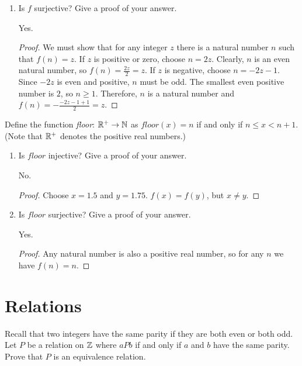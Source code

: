 \documentclass[]{exam}
\begin{document}
\begin{questions}
\begin{enumerate}[label=\alph*)]
\begin{solution}
\end{solution}
\item Is $f$ surjective? Give a proof of your answer.
\begin{solution}
Yes.
\begin{proof}
We must show that for any integer $z$ there is a natural number $n$ such that
$f(n) = z$. If $z$ is positive or zero, choose $n = 2z$. Clearly, $n$ is an 
even natural number, so $f(n) = \frac{2z}{2} = z$. If $z$ is negative, 
choose $n = -2z - 1$. Since $-2z$ is even and positive, $n$ must be odd.
The smallest even positive number is $2$, so $n \geq 1$. Therefore, $n$
is a natural number and $f(n) = -\frac{-2z -1 + 1}{2} = z$.
\end{proof}
\end{solution}
\end{enumerate}

\question
Define the function \emph{floor}: $\mathbb{R}^+ \to \mathbb{N}$ as $floor(x) = n$ if and only if
$n \leq x < n+1$.(Note that $\mathbb{R}^+$ denotes the positive real numbers.)

\begin{enumerate}[label=\alph*)]
\item Is $floor$ injective? Give a proof of your answer. 
\begin{solution}
No.
\begin{proof}
Choose $x = 1.5$ and $y = 1.75$. $f(x) = f(y)$, but $x \neq y$.
\end{proof}
\end{solution}

\item Is $floor$ surjective? Give a proof of your answer.
\begin{solution}
Yes.
\begin{proof}
Any natural number is also a positive real number, so for any $n$ we have $f(n) = n$. 
\end{proof}
\end{solution}

\end{enumerate}

\section*{Relations}

\question Recall that two integers have the same parity if they are both
          even or both odd. Let $P$ be a relation on $\mathbb{Z}$ where $aPb$
          if and only if $a$ and $b$ have the same parity. Prove that
          $P$ is an equivalence relation.


\end{questions}
\end{document}
